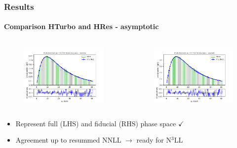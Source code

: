\documentclass[aspectratio=43]{beamer}
\begin{document}
\begin{frame}
	
	\frametitle{Results}
	\framesubtitle{Comparison HTurbo and HRes - asymptotic}
	
	\begin{columns}
		
		
		\begin{figure}
			\includegraphics[width = 7cm]{plots/part3/hturbo_figure_6.png}
		\end{figure}
		
		
		\begin{figure}
			\includegraphics[width = 7cm]{plots/part3/hturbo_figure_7.png}
		\end{figure}
		
	\end{columns}
	
	\begin{itemize}
		\item Represent full (LHS) and fiducial (RHS) phase space {\color{darkgreen}$\checkmark$} 
		\item Agreement up to resummed NNLL $\longrightarrow$ {\color{blue}ready for N$^{3}$LL}
	\end{itemize}

\end{frame}
\end{document}
